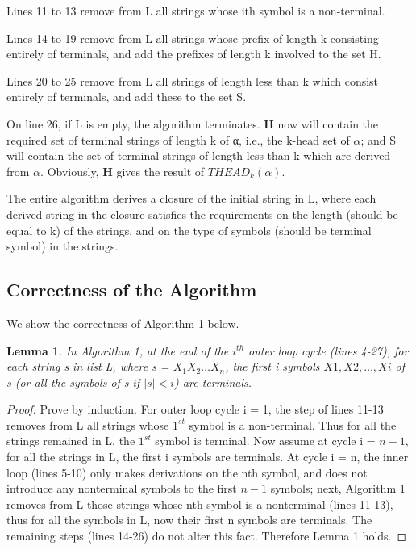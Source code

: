 \documentclass{sig-alternate-05-2015}
\newtheorem{lemma}{Lemma}
\begin{document}
Lines 11 to 13 remove from L all strings whose ith symbol
is a non-terminal.

Lines 14 to 19 remove from L all strings whose prefix of
length k consisting entirely of terminals, and add the prefixes
of length k involved to the set H.

Lines 20 to 25 remove from L all strings of length less
than k which consist entirely of terminals, and add these to
the set S.

On line 26, if L is empty, the algorithm terminates. \textbf{H}
now will contain the required set of terminal strings of
length k of α, i.e., the k-head set of $\alpha$; and S will contain the
set of terminal strings of length less than k which are derived
from $\alpha$. Obviously, \textbf{H} gives the result of $THEAD_k(\alpha)$.

The entire algorithm derives a closure of the initial
string in L, where each derived string in the closure satisfies
the requirements on the length (should be equal to k) of
the strings, and on the type of symbols (should be terminal
symbol) in the strings.


\subsection{Correctness of the Algorithm}
We show the correctness of Algorithm 1 below.

\begin{lemma}
In Algorithm 1, at the end of the $i^{th}$ outer
loop cycle (lines 4-27), for each string s in list L, where s =
$X_1X_2…X_n$, the first i symbols $X1, X2, …, Xi$ of s (or all the
symbols of s if $\mid s \mid < i$) are terminals.
\end{lemma}
\begin{proof}
Prove by induction. For outer loop cycle i = 1, the
step of lines 11-13 removes from L all strings whose $1^{st}$
symbol is a non-terminal. Thus for all the strings remained
in L, the $1^{st}$ symbol is terminal. Now assume at cycle i =
 $n-1$, for all the strings in L, the first i symbols are terminals.
At cycle i = n, the inner loop (lines 5-10) only makes derivations
on the nth symbol, and does not introduce any nonterminal
symbols to the first $n-1$ symbols; next, Algorithm
1 removes from L those strings whose nth symbol is a nonterminal
(lines 11-13), thus for all the symbols in L, now
their first n symbols are terminals. The remaining steps
(lines 14-26) do not alter this fact. Therefore Lemma 1
holds.
\end{proof}
\end{document}
